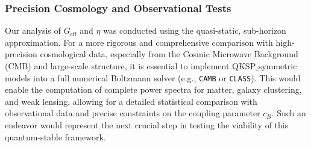 \documentclass[twocolumn]{aastex631}
\begin{document}
\subsubsection{Precision Cosmology and Observational Tests}
Our analysis of $G_{\text{eff}}$ and $\eta$ was conducted using the quasi-static, sub-horizon approximation. For a more rigorous and comprehensive comparison with high-precision cosmological data, especially from the Cosmic Microwave Background (CMB) and large-scale structure, it is essential to implement QKSP\ensuremath{\_}symmetric models into a full numerical Boltzmann solver (e.g., \texttt{CAMB} or \texttt{CLASS}). This would enable the computation of complete power spectra for matter, galaxy clustering, and weak lensing, allowing for a detailed statistical comparison with observational data and precise constraints on the coupling parameter $c_B$. Such an endeavor would represent the next crucial step in testing the viability of this quantum-stable framework.
\end{document}
